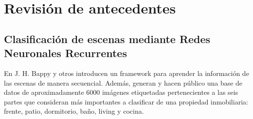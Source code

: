 \section{Revisión de antecedentes}
\subsection{Clasificación de escenas mediante Redes Neuronales Recurrentes}\label{clahe:explanation}
En \cite{lstm_real_estate} J. H. Bappy y otros introducen un framework para aprender la información de las escenas de manera secuencial. Además, generan y hacen público una base de datos de aproximadamente 6000 imágenes etiquetadas pertenecientes a las seis partes que consideran más importantes a clasificar de una propiedad inmobiliaria: frente, patio, dormitorio, baño, living y cocina.

